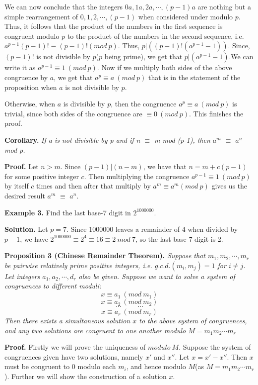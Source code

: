 \documentclass[12pt]{article}
\begin{document}
We can now conclude that the integers $0a, 1a, 2a, \cdots, (p-1)a$ are nothing but a simple rearrangement of $0,1,2, \cdots, (p-1)$ when considered under modulo $p$. Thus, it follows that the product of the numbers in the first sequence is congruent modulo $p$ to the product of the numbers in the second sequence, i.e. $a^{p-1} (p-1)! \equiv (p-1)!(mod \: p)$. Thus, $p|((p-1)!(a^{p-1}-1))$. Since, $(p-1)!$ is not divisible by $p$($p$ being prime), we get that $p|(a^{p-1}-1)$.We can write it as $a^{p-1} \equiv 1 \: ( mod \: p)$. Now if we multiply both sides of the above congruence by $a$, we get that $a^p \equiv a \: ( mod \: p)$ that is in the statement of the proposition when $a$ is not divisible by $p$.

Otherwise, when $a$ is divisible by $p$, then the congruence    $a^p \equiv a \: ( mod \: p)$ is trivial, since both sides of the congruence are $\equiv 0 \: (mod \: p)$. This finishes the proof.

\textbf{Corollary.} \textit{If a is not divisible by p and if n $\equiv$ m mod (p-1), then $a^m$ $\equiv$ $a^n$ mod p.}

\textbf{Proof.} Let $n>m$. Since $(p-1)|(n-m)$, we have that $n=m+c (p-1)$ for some positive integer $c$. Then multiplying the congruence $a^{p-1} \equiv 1 \: ( mod \: p) $ by itself $c$ times and then after that multiply by $a^m \equiv a^m (mod \: p)$ gives us the desired result $a^m$ $\equiv$ $a^n$.

\textbf{Example 3.} Find the last base-7 digit in $2^{1000000}$.

\textbf{Solution.} Let $p=7$. Since 1000000 leaves a remainder of 4 when divided by $p-1$, we have $2^{1000000} \equiv 2^4 \equiv 16 \equiv 2 \: mod \: 7$, so the last base-7 digit is 2.

\textbf{Proposition 3 (Chinese Remainder Theorem).}
\textit{Suppose that $m_1,m_2, \cdots,m_{r}$ be pairwise relatively prime positive integers, i.e. $g.c.d.(m_i,m_j)=1$ for $i  \ne j$. Let integers $a_1,a_2, \cdots, d_{r}$ also be given. Suppose we want to solve a system of congruences to different moduli:
$$x \equiv a_1 \: ( mod \: m_1)$$
$$x \equiv a_2 \: ( mod \: m_2)$$
$$ \cdots \hspace{1cm} \cdots$$
$$x \equiv a_r \: ( mod \: m_r)$$
Then there exists a simultaneous solution $x$ to the above system of congruences, and any two solutions are congruent to one another modulo $M=m_1m_2 \cdots m_r$}

\textbf{Proof.} Firstly we will prove the uniqueness of $modulo \:  M$. Suppose the system of congruences given have two solutions, namely $x'$ and $x''$. Let $x=x'-x''$. Then $x$ must be congruent to 0 modulo each $m_i$, and hence modulo $M$(as $M=m_1m_2 \cdots m_r$). Further we will show the construction of a solution $x$.
\end{document}
